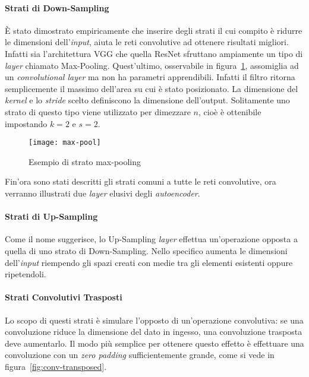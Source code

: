 \paragraph{Strati di Down-Sampling}
È stato dimostrato empiricamente che inserire degli strati il cui compito è ridurre le dimensioni dell'\textit{input}, aiuta le reti convolutive ad ottenere risultati migliori.
Infatti sia l'architettura VGG che quella ResNet sfruttano ampiamente un tipo di \textit{layer} chiamato Max-Pooling.
Quest'ultimo, osservabile in figura~\ref{fig:pool_layer}, assomiglia ad un \textit{convolutional layer} ma non ha parametri apprendibili.
Infatti il filtro ritorna semplicemente il massimo dell'area su cui è stato posizionato.
La dimensione del \textit{kernel} e lo \textit{stride} scelto definiscono la dimensione dell'output.
Solitamente uno strato di questo tipo viene utilizzato per dimezzare $n$, cioè è ottenibile impostando $k=2$ e $s=2$.

\clearpage %

\begin{figure}[ht]
  \begin{center}
    \texttt{[image: max-pool]}
    \caption{Esempio di strato max-pooling}
    \label{fig:pool_layer}
  \end{center}
\end{figure}

Fin'ora sono stati descritti gli strati comuni a tutte le reti convolutive, ora verranno illustrati due \textit{layer} elusivi degli \textit{autoencoder}.

\paragraph{Strati di Up-Sampling}
Come il nome suggerisce, lo Up-Sampling \textit{layer} effettua un'operazione opposta a quella di uno strato di Down-Sampling.
Nello specifico aumenta le dimensioni dell'\textit{input} riempendo gli spazi creati con medie tra gli elementi esistenti oppure ripetendoli.

\paragraph{Strati Convolutivi Trasposti}
Lo scopo di questi strati è simulare l'opposto di un'operazione convolutiva: se una convoluzione riduce la dimensione del dato in ingesso, una convoluzione trasposta deve aumentarlo.
Il modo più semplice per ottenere questo effetto è effettuare una convoluzione con un \textit{zero padding} sufficientemente grande, come si vede in figura~\ref{fig:conv-transposed}.

